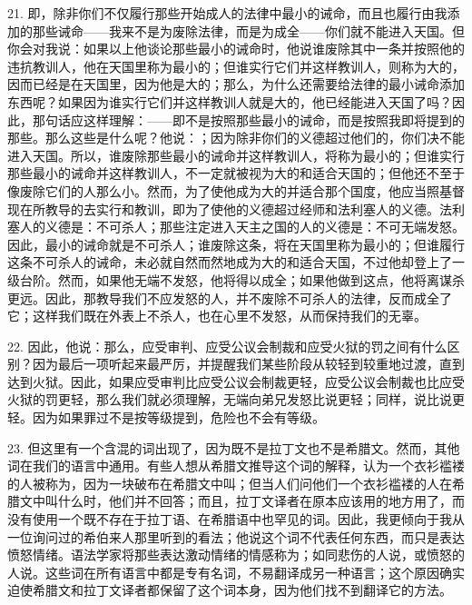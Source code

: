 21. 即，除非你们不仅履行那些开始成人的法律中最小的诫命，而且也履行由我添加的那些诫命——我来不是为废除法律，而是为成全——你们就不能进入天国。但你会对我说：如果以上他谈论那些最小的诫命时，他说谁废除其中一条并按照他的违抗教训人，他在天国里称为最小的；但谁实行它们并这样教训人，则称为大的，因而已经是在天国里，因为他是大的；那么，为什么还需要给法律的最小诫命添加东西呢？如果因为谁实行它们并这样教训人就是大的，他已经能进入天国了吗？因此，那句话应这样理解：——即不是按照那些最小的诫命，而是按照我即将提到的那些。那么这些是什么呢？他说：；因为除非你们的义德超过他们的，你们决不能进入天国。所以，谁废除那些最小的诫命并这样教训人，将称为最小的；但谁实行那些最小的诫命并这样教训人，不一定就被视为大的和适合天国的；但他还不至于像废除它们的人那么小。然而，为了使他成为大的并适合那个国度，他应当照基督现在所教导的去实行和教训，即为了使他的义德超过经师和法利塞人的义德。法利塞人的义德是：不可杀人；那些注定进入天主之国的人的义德是：不可无端发怒。因此，最小的诫命就是不可杀人；谁废除这条，将在天国里称为最小的；但谁履行这条不可杀人的诫命，未必就自然而然地成为大的和适合天国，不过他却登上了一级台阶。然而，如果他无端不发怒，他将得以成全；如果他做到这点，他将离谋杀更远。因此，那教导我们不应发怒的人，并不废除不可杀人的法律，反而成全了它；这样我们既在外表上不杀人，也在心里不发怒，从而保持我们的无辜。\par

22. 因此，他说：那么，应受审判、应受公议会制裁和应受火狱的罚之间有什么区别？因为最后一项听起来最严厉，并提醒我们某些阶段从较轻到较重地过渡，直到达到火狱。因此，如果应受审判比应受公议会制裁更轻，应受公议会制裁也比应受火狱的罚更轻，那么我们就必须理解，无端向弟兄发怒比说更轻；同样，说比说更轻。因为如果罪过不是按等级提到，危险也不会有等级。\par

23. 但这里有一个含混的词出现了，因为既不是拉丁文也不是希腊文。然而，其他词在我们的语言中通用。有些人想从希腊文推导这个词的解释，认为一个衣衫褴褛的人被称为，因为一块破布在希腊文中叫；但当人们问他们一个衣衫褴褛的人在希腊文中叫什么时，他们并不回答；而且，拉丁文译者在原本应该用的地方用了，而没有使用一个既不存在于拉丁语、在希腊语中也罕见的词。因此，我更倾向于我从一位询问过的希伯来人那里听到的看法；他说这个词不代表任何东西，而只是表达愤怒情绪。语法学家将那些表达激动情绪的情感称为；如同悲伤的人说，或愤怒的人说。这些词在所有语言中都是专有名词，不易翻译成另一种语言；这个原因确实迫使希腊文和拉丁文译者都保留了这个词本身，因为他们找不到翻译它的方法。\par

